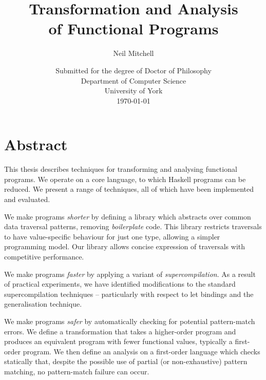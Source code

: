 
\title{Transformation and Analysis \\ of Functional Programs}
\author{Neil Mitchell}
\date{\normalsize{
    \vspace{20mm}
    Submitted for the degree of Doctor of Philosophy \\
    \vspace{10mm}
    Department of Computer Science \\
    University of York \\
    \today}}

\maketitle

\setcounter{page}{2}

\chapter*{Abstract}

This thesis describes techniques for transforming and analysing functional programs. We operate on a core language, to which Haskell programs can be reduced. We present a range of techniques, all of which have been implemented and evaluated.

We make programs \textit{shorter} by defining a library which abstracts over common data traversal patterns, removing \textit{boilerplate} code. This library restricts traversals to have value-specific behaviour for just one type, allowing a simpler programming model. Our library allows concise expression of traversals with competitive performance.

We make programs \textit{faster} by applying a variant of \textit{supercompilation}. As a result of practical experiments, we have identified modifications to the standard supercompilation techniques -- particularly with respect to let bindings and the generalisation technique.

We make programs \textit{safer} by automatically checking for potential pattern-match errors. We define a transformation that takes a higher-order program and produces an equivalent program with fewer functional values, typically a first-order program. We then define an analysis on a first-order language which checks statically that, despite the possible use of partial (or non-exhaustive) pattern matching, no pattern-match failure can occur.


\tableofcontents
\listoffigures
\listoftables

